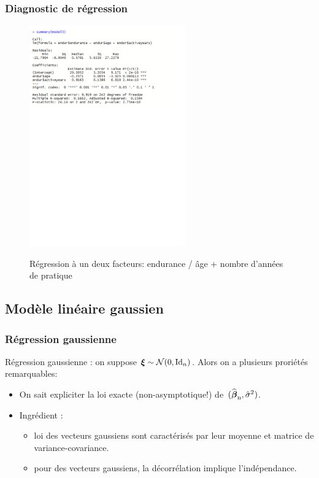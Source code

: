 \begin{frame}
\frametitle{Diagnostic de régression}
\begin{figure}
  \centering
  \includegraphics[width=0.6\textwidth]{summarymodel3}\\
  \caption{Régression à un deux facteurs: endurance / âge + nombre d'années de pratique}
\end{figure}
\end{frame}








\subsection{Modèle linéaire gaussien}

\begin{frame}
\frametitle{Régression gaussienne} \alert{Régression gaussienne} : on
suppose $\boldsymbol{\xi} \sim {\mathcal N}(0,\mathrm{Id}_n)$. Alors on a plusieurs proriétés
remarquables:
\begin{itemize}
\item  On sait expliciter la loi \alert{ exacte} (non-asymptotique!)
de~$(\operatorname{\widehat{\boldsymbol{\beta}}_n},\hat{\sigma}^2)$.\\\vspace{1mm} 
\item \alert{Ingrédient} : 
\begin{itemize}
\item loi des vecteurs gaussiens sont caractérisés par leur moyenne et matrice de
variance-covariance.
\item pour des vecteurs gaussiens, la décorrélation implique l'indépendance.
\end{itemize}
\end{itemize}
\end{frame}

